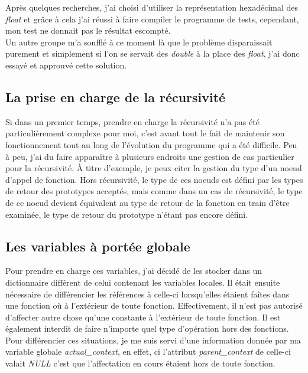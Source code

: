 \documentclass[12pt]{article}
\begin{document}
Après quelques recherches, j'ai choisi d'utiliser la représentation
hexadécimal des {\em float} et grâce à cela j'ai réussi à faire compiler le
programme de tests, cependant, mon test ne donnait pas le résultat escompté.
\\

Un autre groupe m'a soufflé à ce moment là que le problème disparaissait
purement et simplement si l'on se servait des {\em double} à la place des
{\em float}, j'ai donc essayé et approuvé cette solution.

\subsection{La prise en charge de la récursivité}
Si dans un premier temps, prendre en charge la récursivité n'a pas été
particulièrement complexe pour moi, c'est avant tout le fait de maintenir son
fonctionnement tout au long de l'évolution du programme qui a été difficile.
Peu à peu, j'ai du faire apparaître à plusieurs endroits une gestion de cas
particulier pour la récursivité. À titre d'exemple, je peux citer la gestion
du type d'un noeud d'appel de fonction. Hors récursivité, le type de ces
noeuds est défini par les types de retour des prototypes acceptés, mais comme 
dans un cas de récursivité, le type de ce noeud devient équivalent au type de
retour de la fonction en train d'être examinée, le type de retour du prototype
n'étant pas encore défini.

\subsection{Les variables à portée globale}
Pour prendre en charge ces variables, j'ai décidé de les stocker dans un
dictionnaire différent de celui contenant les variables locales. Il était
ensuite nécessaire de différencier les références à celle-ci lorsqu'elles
étaient faîtes dans une fonction où à l'extérieur de toute fonction.
Effectivement, il n'est pas autorisé d'affecter autre chose qu'une constante à
l'extérieur de toute fonction. Il est également interdit de faire n'importe quel
type d'opération hors des fonctions.\\

Pour différencier ces situations, je me suis servi d'une information donnée par
ma variable globale {\em actual\_context}, en effet, ci l'attribut
{\em parent\_context} de celle-ci valait {\em NULL} c'est que l'affectation en
cours étaient hors de toute fonction.\\
\end{document}
